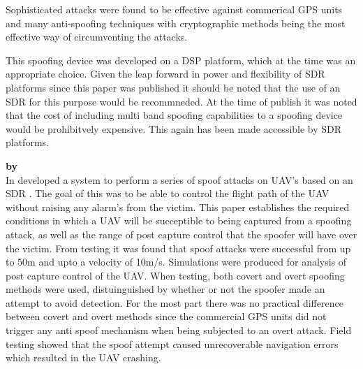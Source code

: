 Sophisticated attacks were found to be effective against commerical GPS units and many anti-spoofing techniques with cryptographic methods being the most 
effective way of circumventing the attacks.

This spoofing device was developed on a DSP platform, which at the time was an appropriate choice. Given the leap forward in power and flexibility
of SDR platforms since this paper was published it should be noted that the use of an SDR for this purpose would be recommneded. At the time of publish
it was noted that the cost of including multi band spoofing capabilities to a spoofing device would be prohibitvely expensive. This again has been made accessible
by SDR platforms. 

\medskip

\textbf{\emph{} by \citeauthor{RN21}} \\
In \citeyear{RN21} \citeauthor{RN21} \cite{RN21} developed a system to perform a series of spoof attacks on UAV's based on an SDR \cite{RN23}. The goal of this was to be able to 
control the flight path of the UAV without raising any alarm's from the victim. This paper establishes the required conditions in which a UAV will
be succeptible to being captured from a spoofing attack, as well as the range of post capture control that the spoofer will have over the victim.
From testing it was found that spoof attacks were successful from up to 50m and upto a velocity of 10m/s.
Simulations were produced for analysis of post capture control of the UAV. 
When testing, both covert and overt spoofing methods were used, distuinguished by whether or not the spoofer made an attempt to avoid detection. 
For the most part there was no practical difference between covert and overt methods since the commercial GPS units did not trigger any anti spoof mechanism when being subjected to an overt attack.
Field testing showed that the spoof attempt caused unrecoverable navigation errors which resulted in the UAV crashing. 

\medskip


